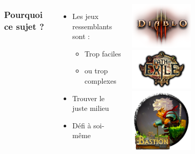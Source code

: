 \documentclass{beamer}
\begin{document}
\begin{frame}
\begin{columns}
\frametitle{Pourquoi ce sujet ?}
\begin{itemize}
	\item Les jeux ressemblants sont :
	\begin{itemize}
		\item Trop faciles
		\item ou trop complexes
	\end{itemize}
	\item Trouver le juste milieu
	\item Défi à soi-même
\end{itemize}
\begin{center}
\includegraphics[width=0.45\textwidth]{img/pres_diablo3.png}\\
\includegraphics[width=0.45\textwidth]{img/pres_poe.png}\\
\includegraphics[width=0.45\textwidth]{img/pres_bastion.png}
\end{center}
\end{columns}
\end{frame}
\end{document}
